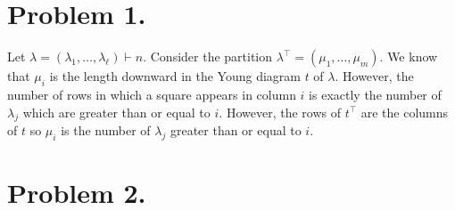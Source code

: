 \documentclass[12pt]{extarticle}
\begin{document}

\section*{Problem 1.}

Let $\lambda = (\lambda_1, \dots, \lambda_{\ell}) \vdash n$. Consider the partition $\lambda^\top = (\mu_1, \dots, \mu_m)$. We know that $\mu_i$ is the length downward in the Young diagram $t$ of $\lambda$. However, the number of rows in which a square appears in column $i$ is exactly the number of $\lambda_j$ which are greater than or equal to $i$. However, the rows of $t^\top$ are the columns of $t$ so $\mu_i$ is the number of $\lambda_j$ greater than or equal to $i$.   

\section*{Problem 2.}
\end{document}
